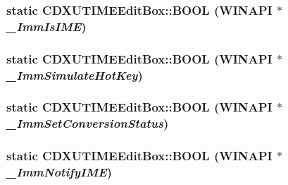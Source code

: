\label{class_c_d_x_u_t_i_m_e_edit_box_a2b8bfe740199d131e01cf47ca67e1270}
\hypertarget{class_c_d_x_u_t_i_m_e_edit_box_ab3159cf044c8eb289cd7ed646a0fb76d}{
\subsubsection[{BOOL}]{\setlength{\rightskip}{0pt plus 5cm}static {\bf CDXUTIMEEditBox::BOOL} (WINAPI $\ast$ {\em \_\-ImmIsIME})}}
\label{class_c_d_x_u_t_i_m_e_edit_box_ab3159cf044c8eb289cd7ed646a0fb76d}
\hypertarget{class_c_d_x_u_t_i_m_e_edit_box_aa9307cf2877e1f886685977900653228}{
\subsubsection[{BOOL}]{\setlength{\rightskip}{0pt plus 5cm}static {\bf CDXUTIMEEditBox::BOOL} (WINAPI $\ast$ {\em \_\-ImmSimulateHotKey})}}
\label{class_c_d_x_u_t_i_m_e_edit_box_aa9307cf2877e1f886685977900653228}
\hypertarget{class_c_d_x_u_t_i_m_e_edit_box_a2dd03073c1bff3083265e0db340e1655}{
\subsubsection[{BOOL}]{\setlength{\rightskip}{0pt plus 5cm}static {\bf CDXUTIMEEditBox::BOOL} (WINAPI $\ast$ {\em \_\-ImmSetConversionStatus})}}
\label{class_c_d_x_u_t_i_m_e_edit_box_a2dd03073c1bff3083265e0db340e1655}
\hypertarget{class_c_d_x_u_t_i_m_e_edit_box_a92caced3bb5c9e6169fb6ad258fb5f5e}{
\subsubsection[{BOOL}]{\setlength{\rightskip}{0pt plus 5cm}static {\bf CDXUTIMEEditBox::BOOL} (WINAPI $\ast$ {\em \_\-ImmNotifyIME})}}
